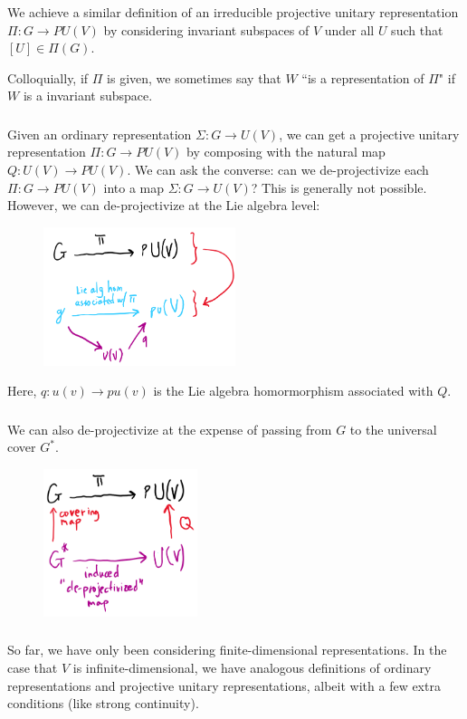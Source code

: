 We achieve a similar definition of an irreducible projective unitary representation $\Pi: G \rightarrow PU(V)$ by considering invariant subspaces of $V$ under all $U$ such that $[U] \in \Pi(G)$.

Colloquially, if $\Pi$ is given, we sometimes say that $W$ ``is a representation of $\Pi$" if $W$ is a invariant subspace.

\subsubsection{}
Given an ordinary representation $\Sigma: G \rightarrow U(V)$, we can get a projective unitary representation $\Pi: G \rightarrow PU(V)$ by composing with the natural map $Q: U(V) \rightarrow PU(V)$. We can ask the converse: can we de-projectivize each $\Pi: G \rightarrow PU(V)$ into a map $\Sigma: G \rightarrow U(V)$? This is generally not possible. However, we can de-projectivize at the Lie algebra level:
\begin{figure}[H]
    \includegraphics[width=0.5\textwidth]{figures/de-projectivization}
    \centering
\end{figure}

Here, $q: u(v) \rightarrow pu(v)$ is the Lie algebra homormorphism associated with $Q$.

\subsubsection{}
We can also de-projectivize at the expense of passing from $G$ to the universal cover $G^*$.
\begin{figure}[H]
    \includegraphics[width=0.4\textwidth]{figures/de-projectivization2}
    \centering
\end{figure}

\subsubsection{}
So far, we have only been considering finite-dimensional representations. In the case that $V$ is infinite-dimensional, we have analogous definitions of ordinary representations and projective unitary representations, albeit with a few extra conditions (like strong continuity).
